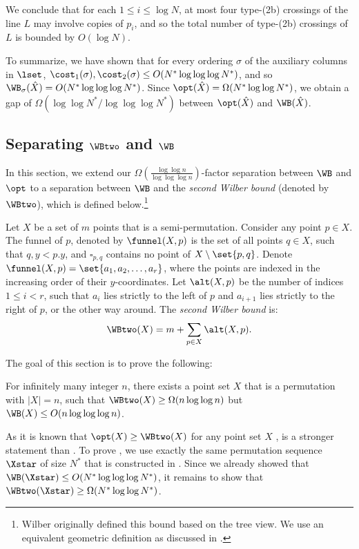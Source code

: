 We conclude that for each $1\leq i\leq \log N$, at most four type-(2b) crossings of the line $L$ may involve copies of $p_i$, and so the total number of type-(2b) crossings of $L$ is bounded by $O(\log N)$.


To summarize, we have shown that for every ordering $\sigma$ of the auxiliary columns in $\lset$, $\cost_1(\sigma),\cost_2(\sigma)\leq O(N^*\log\log\log N^*)$, and so $\WB_{\sigma}(\hat X)=O(N^*\log\log\log N^*)$. Since $\opt(\hat X)=\Omega(N^*\log\log N^*)$, we obtain a gap of $\Omega(\log\log N^*/\log\log\log N^*)$ between $\opt(\hat X)$ and $\WB(\hat X)$.

\subsection{Separating $\WBtwo$ and $\WB$}
\label{subsec: separating two wilbers}

In this section, we extend our $\Omega(\frac{\log\log n}{\log\log\log n})$-factor
separation between $\WB$ and $\opt$ to a separation between $\WB$
and the \emph{second Wilber bound} (denoted by $\WBtwo$), which is defined below.\footnote{Wilber originally defined this bound based on the tree view. We use an equivalent geometric definition as discussed in \cite{DHIKP09,in_pursuit}.}


Let $X$ be a set of $m$ points that is a semi-permutation. Consider any point $p\in X$. The funnel of $p$, denoted by $\funnel(X,p)$ is the set of all points $q\in X$, such that $q,y<p.y$, and $\square_{p,q}$ contains no point of $X\setminus\set{p,q}$. 
Denote $\funnel(X,p)=\set{a_1,a_2,\ldots,a_r}$, where the points are indexed in the increasing order of their $y$-coordinates. Let $\alt(X,p)$ be the number of indices $1\leq i<r$, such that $a_i$ lies strictly to the left of $p$ and $a_{i+1}$ lies strictly to the right of $p$, or the other way around. The
\emph{second Wilber bound } is:
\[
\WBtwo(X)=m+\sum_{p\in X}\alt(X,p).
\]


The goal of this section is to prove the following:
\begin{theorem}
\label{thm:sep WBtwo}For infinitely many integer $n$, there exists a point set $X$ that is a permutation with $|X|=n$, such that $\WBtwo(X)\ge\Omega(n\log\log n)$ but $\WB(X)\le O(n\log\log\log n)$.
\end{theorem}

As it is known that $\opt(X)\ge\WBtwo(X)$ for any point set $X$ \cite{wilber},
 is a stronger statement than .
To prove , we use exactly the same permutation
sequence $\Xstar$ of size $N^{*}$ that is constructed in . Since we already showed that  $\WB(\Xstar)\le O(N^{*}\log\log\log N^{*})$, 
it remains to show that $\WBtwo(\Xstar)\ge\Omega(N^{*}\log\log N^{*})$.

